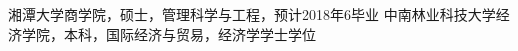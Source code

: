 %
%
%


\begin{scholarship}
					{湘潭大学商学院，硕士，管理科学与工程，预计2018年6毕业}
					{中南林业科技大学经济学院，本科，国际经济与贸易，经济学学士学位}
\end{scholarship}